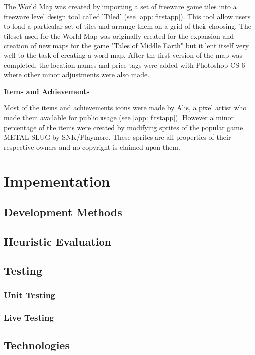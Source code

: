 \documentclass{mproj}
\begin{document}
The World Map was created by importing a set of freeware game tiles into a freeware level design tool called 'Tiled' (see \ref{app: firstapp}). This tool allow users to load a particular set of tiles and arrange them on a grid of their choosing. The tileset used for the World Map was originally created for the expansion and creation of new maps for the game "Tales of Middle Earth" but it lent itself very well to the task of creating a word map. After the first version of the map was completed, the location names and price tags were added with Photoshop CS 6 where other minor adjustments were also made.

\textbf{Items and Achievements}

Most of the items and achievements icons were made by Alis, a pixel artist who made them available for public usage (see \ref{app: firstapp}). However a minor percentage of the items were created by modifying sprites of the popular game METAL SLUG  by SNK/Playmore. These sprites are all properties of their respective owners and no copyright is claimed upon them. 


\chapter{Impementation}
\label{implementation}


\section{Development Methods}
\section{Heuristic Evaluation}
\section{Testing}
\subsection{Unit Testing}
\subsection{Live Testing}
\section{Technologies}
\end{document}
